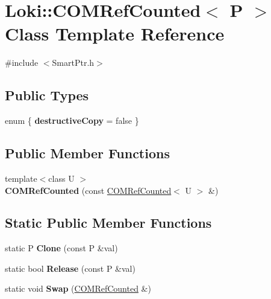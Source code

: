 \hypertarget{classLoki_1_1COMRefCounted}{}\section{Loki\+:\+:C\+O\+M\+Ref\+Counted$<$ P $>$ Class Template Reference}
\label{classLoki_1_1COMRefCounted}


{\ttfamily \#include $<$Smart\+Ptr.\+h$>$}

\subsection*{Public Types}
\begin{DoxyCompactItemize}
\item 
\hypertarget{classLoki_1_1COMRefCounted_a0ff8aff1daa6d84a8bf3e2bb439a8e8c}{}enum \{ {\bfseries destructive\+Copy} = false
 \}\label{classLoki_1_1COMRefCounted_a0ff8aff1daa6d84a8bf3e2bb439a8e8c}

\end{DoxyCompactItemize}
\subsection*{Public Member Functions}
\begin{DoxyCompactItemize}
\item 
\hypertarget{classLoki_1_1COMRefCounted_a4ce8846ccf9c6fb39671fdeda74a31fb}{}{\footnotesize template$<$class U $>$ }\\{\bfseries C\+O\+M\+Ref\+Counted} (const \hyperlink{classLoki_1_1COMRefCounted}{C\+O\+M\+Ref\+Counted}$<$ U $>$ \&)\label{classLoki_1_1COMRefCounted_a4ce8846ccf9c6fb39671fdeda74a31fb}

\end{DoxyCompactItemize}
\subsection*{Static Public Member Functions}
\begin{DoxyCompactItemize}
\item 
\hypertarget{classLoki_1_1COMRefCounted_a86164773a71c85f705c965a0d71e5ce2}{}static P {\bfseries Clone} (const P \&val)\label{classLoki_1_1COMRefCounted_a86164773a71c85f705c965a0d71e5ce2}

\item 
\hypertarget{classLoki_1_1COMRefCounted_a1d116b50e81bfa0b6a1661ed259952a8}{}static bool {\bfseries Release} (const P \&val)\label{classLoki_1_1COMRefCounted_a1d116b50e81bfa0b6a1661ed259952a8}

\item 
\hypertarget{classLoki_1_1COMRefCounted_a81b8aa921ddbe215b54c88aea6afaa1a}{}static void {\bfseries Swap} (\hyperlink{classLoki_1_1COMRefCounted}{C\+O\+M\+Ref\+Counted} \&)\label{classLoki_1_1COMRefCounted_a81b8aa921ddbe215b54c88aea6afaa1a}

\end{DoxyCompactItemize}


